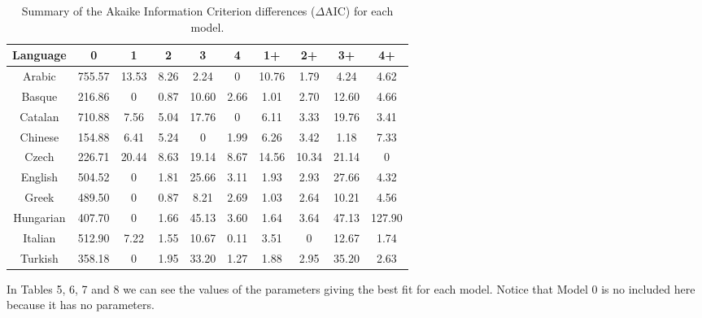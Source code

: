 \documentclass{article}
\begin{document}
\begin{table}[H]
\centering
\begin{tabular}{cccccccccc}
    Language & 0 & 1 & 2 & 3 & 4 & 1+ & 2+ & 3+ & 4+ \\
    \hline
    Arabic      & 755.57    & 13.53     & 8.26    & 2.24    & 0     & 10.76     & 1.79      & 4.24      &  4.62  \\
    Basque      & 216.86    & 0         & 0.87    & 10.60   & 2.66  & 1.01      & 2.70      & 12.60     &  4.66  \\
    Catalan     & 710.88    & 7.56      & 5.04    & 17.76   & 0     & 6.11      & 3.33      & 19.76     &  3.41  \\
    Chinese     & 154.88    & 6.41      & 5.24    & 0       & 1.99  & 6.26      & 3.42      & 1.18      &  7.33  \\
    Czech       &  226.71   & 20.44     & 8.63    & 19.14   & 8.67  & 14.56     & 10.34     & 21.14     &  0  \\
    English     & 504.52    & 0         & 1.81    & 25.66   & 3.11  & 1.93      & 2.93      & 27.66     &  4.32  \\
    Greek       & 489.50    & 0         & 0.87    & 8.21    & 2.69  & 1.03      & 2.64      & 10.21     &  4.56  \\
    Hungarian   & 407.70    & 0         & 1.66    & 45.13   & 3.60  & 1.64      & 3.64      & 47.13     &  127.90  \\
    Italian     & 512.90    & 7.22      & 1.55    & 10.67   & 0.11  & 3.51      & 0         & 12.67     &  1.74  \\
    Turkish     & 358.18    & 0         & 1.95    & 33.20   & 1.27  & 1.88      & 2.95      & 35.20     &  2.63  \\
    \hline
\end{tabular}
\label{Table:T4}
\caption{Summary of the Akaike Information Criterion differences ($\Delta$AIC) for each model.}
\end{table}

In Tables 5, 6, 7 and 8 we can see the values of the parameters giving the best fit for each
model. Notice that Model 0 is no included here because it has no parameters.
\end{document}
